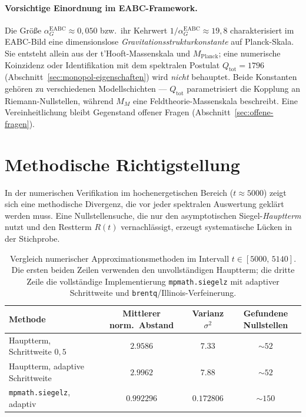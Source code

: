 \documentclass[11pt,a4paper]{article}
\newcommand{\convFiftyVar}{0.172806}
\newcommand{\convFiftyMean}{0.992296}
\newcommand{\badMeanFixed}{2.9586}
\newcommand{\badVarFixed}{7.33}
\newcommand{\badMeanAdapt}{2.9962}
\newcommand{\badVarAdapt}{7.88}
\newcommand{\badCountInterval}{52}
\newcommand{\goodCountInterval}{150}
\begin{document}
\paragraph{Vorsichtige Einordnung im EABC-Framework.}
Die Größe $\alpha_G^{\mathrm{EABC}}\approx 0{,}050$ bzw.\ ihr Kehrwert
$1/\alpha_G^{\mathrm{EABC}}\approx 19{,}8$ charakterisiert im EABC-Bild eine
dimensionslose \emph{Gravitationsstrukturkonstante} auf Planck-Skala.
Sie entsteht allein aus der t'Hooft-Massenskala und $M_{\mathrm{Planck}}$;
eine numerische Koinzidenz oder Identifikation mit dem spektralen Postulat
$Q_{\mathrm{tot}}=1796$ (Abschnitt~\ref{sec:monopol-eigenschaften}) wird
\emph{nicht} behauptet. Beide Konstanten gehören zu verschiedenen
Modellschichten --- $Q_{\mathrm{tot}}$ parametrisiert die Kopplung an
Riemann-Nullstellen, während $M_M$ eine Feldtheorie-Massenskala beschreibt.
Eine Vereinheitlichung bleibt Gegenstand offener Fragen
(Abschnitt~\ref{sec:offene-fragen}).

\section{Methodische Richtigstellung}
\label{sec:methodische-richtigstellung}

In der numerischen Verifikation im hochenergetischen Bereich ($t\approx 5000$)
zeigt sich eine methodische Divergenz, die vor jeder spektralen Auswertung
geklärt werden muss.
Eine Nullstellensuche, die nur den asymptotischen Siegel-\emph{Hauptterm} nutzt
und den Restterm $R(t)$ vernachlässigt, erzeugt systematische Lücken in der Stichprobe.

\begin{table}[htbp]
\centering
\caption{Vergleich numerischer Approximationsmethoden im Intervall $t \in [5000,\,5140]$.
Die ersten beiden Zeilen verwenden den unvollständigen Hauptterm; die dritte Zeile die
vollständige Implementierung \texttt{mpmath.siegelz} mit adaptiver Schrittweite
und \texttt{brentq}/Illinois-Verfeinerung.}
\label{tab:siegel_vergleich}
\begin{tabular}{lccc}
\toprule
\textbf{Methode} &
\textbf{Mittlerer norm.\ Abstand} &
\textbf{Varianz $\sigma^2$} &
\textbf{Gefundene Nullstellen} \\
\midrule
Hauptterm, Schrittweite $0{,}5$ &
$\badMeanFixed$ & $\badVarFixed$ & $\sim\badCountInterval$ \\
Hauptterm, adaptive Schrittweite &
$\badMeanAdapt$ & $\badVarAdapt$ & $\sim\badCountInterval$ \\
\texttt{mpmath.siegelz}, adaptiv &
$\convFiftyMean$ & $\convFiftyVar$ & $\sim\goodCountInterval$ \\
\bottomrule
\end{tabular}
\end{table}
\end{document}
